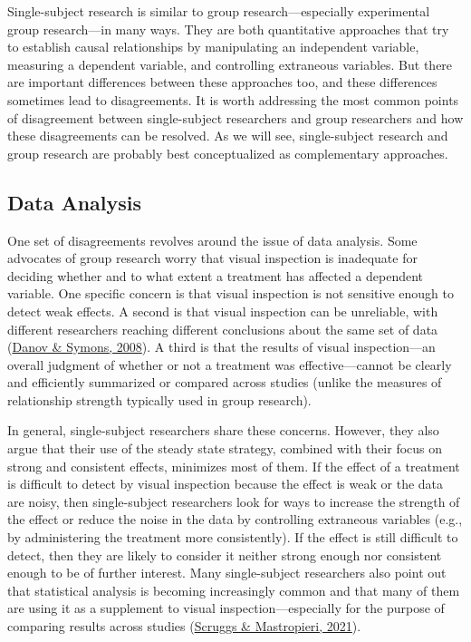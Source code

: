 \documentclass[
]{krantz}
\begin{document}
Single-subject research is similar to group research---especially experimental group research---in many ways. They are both quantitative approaches that try to establish causal relationships by manipulating an independent variable, measuring a dependent variable, and controlling extraneous variables. But there are important differences between these approaches too, and these differences sometimes lead to disagreements. It is worth addressing the most common points of disagreement between single-subject researchers and group researchers and how these disagreements can be resolved. As we will see, single-subject research and group research are probably best conceptualized as complementary approaches.

\hypertarget{data-analysis}{%
\subsection*{Data Analysis}\label{data-analysis}}


One set of disagreements revolves around the issue of data analysis. Some advocates of group research worry that visual inspection is inadequate for deciding whether and to what extent a treatment has affected a dependent variable. One specific concern is that visual inspection is not sensitive enough to detect weak effects. A second is that visual inspection can be unreliable, with different researchers reaching different conclusions about the same set of data (\protect\hyperlink{ref-danov2008survey}{Danov \& Symons, 2008}). A third is that the results of visual inspection---an overall judgment of whether or not a treatment was effective---cannot be clearly and efficiently summarized or compared across studies (unlike the measures of relationship strength typically used in group research).

In general, single-subject researchers share these concerns. However, they also argue that their use of the steady state strategy, combined with their focus on strong and consistent effects, minimizes most of them. If the effect of a treatment is difficult to detect by visual inspection because the effect is weak or the data are noisy, then single-subject researchers look for ways to increase the strength of the effect or reduce the noise in the data by controlling extraneous variables (e.g., by administering the treatment more consistently). If the effect is still difficult to detect, then they are likely to consider it neither strong enough nor consistent enough to be of further interest. Many single-subject researchers also point out that statistical analysis is becoming increasingly common and that many of them are using it as a supplement to visual inspection---especially for the purpose of comparing results across studies (\protect\hyperlink{ref-scruggs2021summarize}{Scruggs \& Mastropieri, 2021}).
\end{document}
